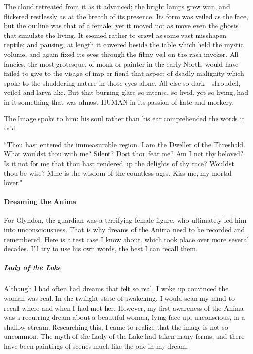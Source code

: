 \begin{quotex}
The cloud retreated from it as it advanced; the bright lamps grew wan, and flickered restlessly as at the breath of its
presence. Its form was veiled as the face, but the outline was that of a female; yet it moved not as move even the
ghosts that simulate the living. It seemed rather to crawl as some vast misshapen reptile; and pausing, at length it
cowered beside the table which held the mystic volume, and again fixed its eyes through the filmy veil on the rash
invoker. All fancies, the most grotesque, of monk or painter in the early North, would have failed to give to the
visage of imp or fiend that aspect of deadly malignity which spoke to the shuddering nature in those eyes alone. All
else so dark—shrouded, veiled and larva-like. But that burning glare so intense, so livid, yet so
living, had in it something that was almost HUMAN in its passion of hate and mockery.

The Image spoke to him: his soul rather than his ear comprehended the words it said.

``Thou hast entered the immeasurable region. I am the Dweller of the Threshold. What wouldst thou with me? Silent? Dost
thou fear me? Am I not thy beloved? Is it not for me that thou hast rendered up the delights of thy race? Wouldst thou
be wise? Mine is the wisdom of the countless ages. Kiss me, my mortal lover." 

\end{quotex}
\paragraph{Dreaming the Anima}
For Glyndon, the guardian was a terrifying female figure, who ultimately led him into unconsciousness. That is why
dreams of the Anima need to be recorded and remembered. Here is a test case I know about, which took place over more
several decades. I'll try to use his own words, the best I can recall them.

\subparagraph{Lady of the Lake}
Although I had often had dreams that felt so real, I woke up convinced the woman was real. In the twilight state of
awakening, I would scan my mind to recall where and when I had met her. However, my first awareness of the Anima was a
recurring dream about a beautiful woman, lying face up, unconscious, in a shallow stream. Researching this, I came to
realize that the image is not so uncommon. The myth of the Lady of the Lake had taken many forms, and there have been
paintings of scenes much like the one in my dream.

